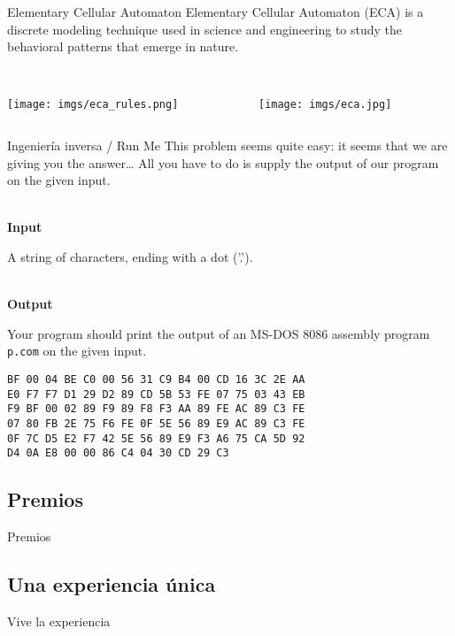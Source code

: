 \begin{frame}{Elementary Cellular Automaton}
    Elementary Cellular Automaton (ECA) is a discrete modeling technique used in science and engineering to
    study the behavioral patterns that emerge in nature. \\~

    \begin{columns}
    \begin{column}{0.50\textwidth}
        \texttt{[image: imgs/eca\_rules.png]}
    \end{column}
    
    \begin{column}{0.50\textwidth}
        \texttt{[image: imgs/eca.jpg]}
    \end{column}
    \end{columns}
\end{frame}

\begin{frame}[fragile]{Ingeniería inversa / Run Me}
    This problem seems quite easy: it seems that we are giving you the answer…
    All you have to do is supply the output of our program on the given input. \\~
    
    \textbf{Input}

    A string of characters, ending with a dot ('.'). \\~
    
    \textbf{Output}

    Your program should print the output of an MS-DOS 8086 assembly program
    \texttt{p.com} on the given input.
    
    \begin{lstlisting}
BF 00 04 BE C0 00 56 31 C9 B4 00 CD 16 3C 2E AA
E0 F7 F7 D1 29 D2 89 CD 5B 53 FE 07 75 03 43 EB
F9 BF 00 02 89 F9 89 F8 F3 AA 89 FE AC 89 C3 FE
07 80 FB 2E 75 F6 FE 0F 5E 56 89 E9 AC 89 C3 FE
0F 7C D5 E2 F7 42 5E 56 89 E9 F3 A6 75 CA 5D 92
D4 0A E8 00 00 86 C4 04 30 CD 29 C3
    \end{lstlisting}
\end{frame}

\subsection{Premios}
\begin{frame}{Premios}
\end{frame}

\subsection{Una experiencia única}
\begin{frame}{Vive la experiencia}

\end{frame}